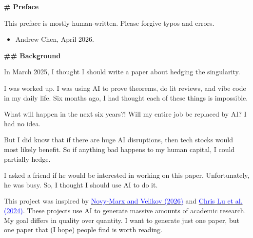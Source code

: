 \documentclass[12pt]{article}
\begin{document}
\vspace{1.0em}
\begin{mdframed}[
linewidth=1pt,
linecolor=black,
innerleftmargin=0.25em,
innerrightmargin=0.25em,
innertopmargin=0.2\baselineskip,
innerbottommargin=0.8\baselineskip
]
\begingroup
\fontsize{10.5pt}{12.6pt}\selectfont
\ttfamily
\setlength{\parindent}{0pt}
\setlength{\parskip}{0.5\baselineskip}
\sloppy
\setlength{\emergencystretch}{3em}
\par
{\Large\bfseries \textcolor{red!70!black}{\# Preface}}
\par

This preface is mostly human-written. Please forgive typos and errors.

\vspace{-2ex}
\begin{itemize}
\setlength{\itemsep}{0.15em}
\setlength{\parskip}{0pt}
\item Andrew Chen, April 2026.
\end{itemize}
\vspace{-2ex}

\par
{\large\bfseries \textcolor{red!70!black}{\#\# Background}}
\par

In March 2025, I thought I should write a paper about hedging the singularity.

I was worked up. I was using AI to prove theorems, do lit reviews, and vibe code in my daily life. Six months ago, I had thought each of these things is impossible.

What will happen in the next six years?! Will my entire job be replaced by AI? I had no idea.

But I did know that if there are huge AI disruptions, then tech stocks would most likely benefit. So if anything bad happens to my human capital, I could partially hedge.

I asked a friend if he would be interested in working on this paper. Unfortunately, he was busy. So, I thought I should use AI to do it.

This project was inspired by \href{https://www.aeaweb.org/articles?id=10.1257/jel.20251821}{\textcolor{blue}{Novy-Marx and Velikov (2026)}}  and \href{https://arxiv.org/abs/2408.06292}{\textcolor{blue}{Chris Lu et al. (2024)}}. These projects use AI to generate massive amounts of academic research. My goal differs in quality over quantity. I want to generate just one paper, but one paper that (I hope) people find is worth reading.


\end{mdframed}
\end{document}
